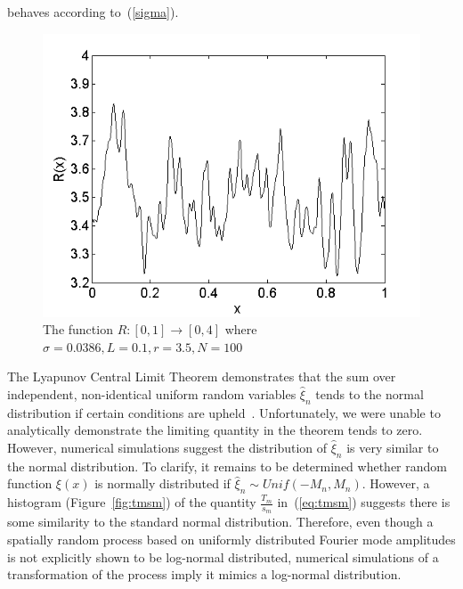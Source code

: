 behaves according to~(\ref{sigma}).
\begin{figure}[!h]
\caption[The function $R(x)$]{The function $R:[0,1]\to [0,4]$ where
  $\sigma=0.0386, L=0.1, r=3.5, N=100$}\label{fig:R}
	\begin{center}
		\includegraphics[scale=0.6]{figs/xi.png}
	\end{center}
\end{figure}

The Lyapunov Central Limit Theorem demonstrates that
the sum over independent, non-identical uniform random variables
$\hat{\xi}_n$ tends to the normal distribution if certain conditions
are upheld~\cite{billingsley}. Unfortunately, we were unable to
analytically demonstrate the limiting quantity in the theorem tends to
zero. However, numerical simulations suggest the distribution of
$\hat{\xi}_n$ is very similar to the normal distribution. To clarify,
it remains to be determined whether random function $\xi(x)$ is
normally distributed if $\hat{\xi}_n \sim Unif(-M_n,M_n)$. However, a histogram (Figure~\ref{fig:tmsm}) of the quantity $\frac{T_m}{s_m}$ in~(\ref{eq:tmsm})
suggests there is some similarity to the standard normal
distribution. Therefore, even though a spatially random process based
on uniformly distributed Fourier mode amplitudes is not explicitly
shown to be log-normal distributed, numerical simulations of a
transformation of the process imply it mimics a log-normal distribution.

